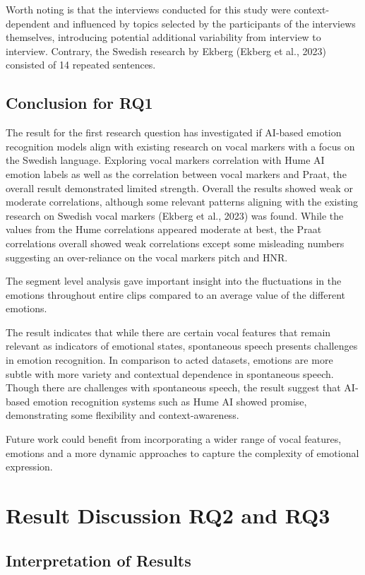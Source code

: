 Worth noting is that the interviews conducted for this study were context-dependent and influenced by topics selected by the participants of the interviews themselves, introducing potential additional variability from interview to interview. Contrary, the Swedish research by Ekberg (Ekberg et al., 2023) consisted of 14 repeated sentences.

\subsection{Conclusion for RQ1}
The result for the first research question has investigated if AI-based emotion recognition models align with existing research on vocal markers with a focus on the Swedish language.
Exploring vocal markers correlation with Hume AI emotion labels as well as the correlation between vocal markers and Praat, the overall result demonstrated limited strength.
Overall the results showed weak or moderate correlations, although some relevant patterns aligning with the existing research on Swedish vocal markers (Ekberg et al., 2023) was found.
While the values from the Hume correlations appeared moderate at best, the Praat correlations overall showed weak correlations except some misleading numbers suggesting an over-reliance on the vocal markers pitch and HNR.

The segment level analysis gave important insight into the fluctuations in the emotions throughout entire clips compared to an average value of the different emotions.

The result indicates that while there are certain vocal features that remain relevant as indicators of emotional states, spontaneous speech presents challenges in emotion recognition. In comparison to acted datasets, emotions are more subtle with more variety and contextual dependence in spontaneous speech.
Though there are challenges with spontaneous speech, the result suggest that AI-based emotion recognition systems such as Hume AI showed promise, demonstrating some flexibility and context-awareness.

Future work could benefit from incorporating a wider range of vocal features, emotions and a more dynamic approaches to capture the complexity of emotional expression.

\section{Result Discussion RQ2 and RQ3}

\subsection{Interpretation of Results}
